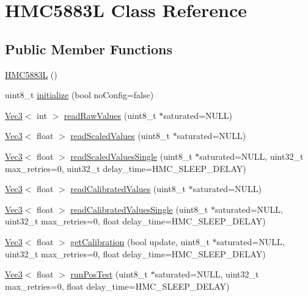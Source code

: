 \hypertarget{class_h_m_c5883_l}{\section{H\+M\+C5883\+L Class Reference}
\label{class_h_m_c5883_l}
}
\subsection*{Public Member Functions}
\begin{DoxyCompactItemize}
\item 
\hyperlink{class_h_m_c5883_l_ab552ed5dd985c500aa37ac11f9ed3eed}{H\+M\+C5883\+L} ()
\item 
uint8\+\_\+t \hyperlink{class_h_m_c5883_l_adce69beed189b56b294775e273768b87}{initialize} (bool no\+Config=false)
\item 
\hyperlink{struct_vec3}{Vec3}$<$ int $>$ \hyperlink{class_h_m_c5883_l_aef71c4ee9d0a549cb86f6bb90bb238b2}{read\+Raw\+Values} (uint8\+\_\+t $\ast$saturated=N\+U\+L\+L)
\item 
\hyperlink{struct_vec3}{Vec3}$<$ float $>$ \hyperlink{class_h_m_c5883_l_ac270d4672e1e0ed759ee07a504f2ab00}{read\+Scaled\+Values} (uint8\+\_\+t $\ast$saturated=N\+U\+L\+L)
\item 
\hyperlink{struct_vec3}{Vec3}$<$ float $>$ \hyperlink{class_h_m_c5883_l_a16828549ee509bb4fa8a3995424c8889}{read\+Scaled\+Values\+Single} (uint8\+\_\+t $\ast$saturated=N\+U\+L\+L, uint32\+\_\+t max\+\_\+retries=0, uint32\+\_\+t delay\+\_\+time=H\+M\+C\+\_\+\+S\+L\+E\+E\+P\+\_\+\+D\+E\+L\+A\+Y)
\item 
\hyperlink{struct_vec3}{Vec3}$<$ float $>$ \hyperlink{class_h_m_c5883_l_a6cc926cb263a856f4f3f77092d550139}{read\+Calibrated\+Values} (uint8\+\_\+t $\ast$saturated=N\+U\+L\+L)
\item 
\hyperlink{struct_vec3}{Vec3}$<$ float $>$ \hyperlink{class_h_m_c5883_l_acfb30a00675cd4a71809b103b06edfaa}{read\+Calibrated\+Values\+Single} (uint8\+\_\+t $\ast$saturated=N\+U\+L\+L, uint32\+\_\+t max\+\_\+retries=0, float delay\+\_\+time=H\+M\+C\+\_\+\+S\+L\+E\+E\+P\+\_\+\+D\+E\+L\+A\+Y)
\item 
\hyperlink{struct_vec3}{Vec3}$<$ float $>$ \hyperlink{class_h_m_c5883_l_afe8557a9869b1b8be968db2eb26eb373}{get\+Calibration} (bool update, uint8\+\_\+t $\ast$saturated=N\+U\+L\+L, uint32\+\_\+t max\+\_\+retries=0, float delay\+\_\+time=H\+M\+C\+\_\+\+S\+L\+E\+E\+P\+\_\+\+D\+E\+L\+A\+Y)
\item 
\hyperlink{struct_vec3}{Vec3}$<$ float $>$ \hyperlink{class_h_m_c5883_l_a041550377640f94f3d78cac70a781093}{run\+Pos\+Test} (uint8\+\_\+t $\ast$saturated=N\+U\+L\+L, uint32\+\_\+t max\+\_\+retries=0, float delay\+\_\+time=H\+M\+C\+\_\+\+S\+L\+E\+E\+P\+\_\+\+D\+E\+L\+A\+Y)

\end{DoxyCompactItemize}
